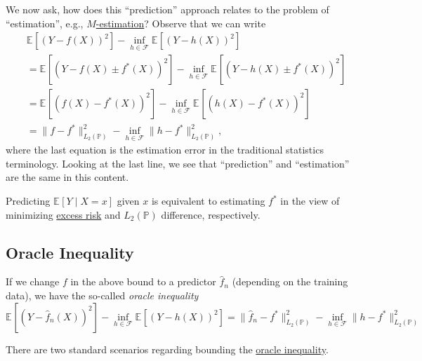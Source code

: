 We now ask, how does this ``prediction'' approach relates to the problem of ``estimation'', e.g., \hyperref[prb:M-estimation]{\(M\)-estimation}? Observe that we can write
\begin{align*}
	 & \mathbb{E}_{}\left[ ( Y - f(X) ) ^2 \right] - \inf _{h \in \mathscr{F} } \mathbb{E}_{}\left[( Y - h(X) ) ^2 \right]                                                      \\
	 & = \mathbb{E}_{}\left[ ( Y - f(X) \pm f^{\ast} (X) ) ^2 \right]  - \inf _{h \in \mathscr{F} } \mathbb{E}_{}\left[( Y - h(X) \pm f^{\ast} (X)) ^2 \right]                  \\
	 & = \mathbb{E}_{}\left[ ( f(X) - f^{\ast} (X) ) ^2 \right] - \inf _{h \in \mathscr{F} } \mathbb{E}_{}\left[( h(X) - f^{\ast} (X) ) ^2 \right] \tag*{cross terms are \(0\)} \\
	 & = \lVert f - f^{\ast}  \rVert _{L_2(\mathbb{P} )}^2 - \inf _{h\in \mathscr{F} } \lVert h - f^{\ast}  \rVert _{L_2(\mathbb{P} )} ^2,
\end{align*}
where the last equation is the estimation error in the traditional statistics terminology. Looking at the last line, we see that ``prediction'' and ``estimation'' are the same in this content.

\begin{intuition}
	Predicting \(\mathbb{E}_{}\left[Y \mid X = x \right] \) given \(x\) is equivalent to estimating \(f^{\ast} \) in the view of minimizing \hyperref[def:excess-risk]{excess risk} and \(L_2(\mathbb{P} )\) difference, respectively.
\end{intuition}

\subsection{Oracle Inequality}
If we change \(f\) in the above bound to a predictor \(\hat{f} _n \) (depending on the training data), we have the so-called \emph{oracle inequality}
\begin{equation}\label{eq:oracle-inequality}
	\mathbb{E}_{}\left[ ( Y - \hat{f} _n(X) ) ^2 \right] - \inf _{h \in \mathscr{F} } \mathbb{E}_{}\left[ ( Y - h(X) ) ^2 \right]
	= \lVert \hat{f} _n - f^{\ast}  \rVert _{L_2(\mathbb{P} )}^2 - \inf _{h\in \mathscr{F} } \lVert h - f^{\ast}  \rVert _{L_2(\mathbb{P} )} ^2
\end{equation}

There are two standard scenarios regarding bounding the \hyperref[eq:oracle-inequality]{oracle inequality}.


